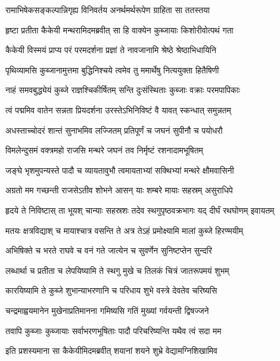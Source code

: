 \twolineshloka
{रामाभिषेकसङ्कल्पान्निगृह्य विनिवर्तय}
{अनर्थमर्थरूपेण ग्राहिता सा ततस्तया} %

\twolineshloka
{हृष्टा प्रतीता कैकेयी मन्थरामिदमब्रवीत्}
{सा हि वाक्येन कुब्जायाः किशोरीवोत्पथं गता} %

\twolineshloka
{कैकेयी विस्मयं प्राप्य परं परमदर्शना}
{प्रज्ञां ते नावजानामि श्रेष्ठे श्रेष्ठाभिधायिनि} %

\twolineshloka
{पृथिव्यामसि कुब्जानामुत्तमा बुद्धिनिश्चये}
{त्वमेव तु ममार्थेषु नित्ययुक्ता हितैषिणी} %

\twolineshloka
{नाहं समवबुद्ध्येयं कुब्जे राज्ञश्चिकीर्षितम्}
{सन्ति दुःसंस्थिताः कुब्जाः वक्राः परमपापिकाः} %

\twolineshloka
{त्वं पद्ममिव वातेन सन्नता प्रियदर्शना}
{उरस्तेऽभिनिविष्टं वै यावत् स्कन्धात् समुन्नतम्} %

\twolineshloka
{अधस्ताच्चोदरं शान्तं सुनाभमिव लज्जितम्}
{प्रतिपूर्णं च जघनं सुपीनौ च पयोधरौ} %

\twolineshloka
{विमलेन्दुसमं वक्त्रमहो राजसि मन्थरे}
{जघनं तव निर्मृष्टं रशनादामभूषितम्} %

\twolineshloka
{जङ्घे भृशमुपन्यस्ते पादौ च व्यायतावुभौ}
{त्वमायताभ्यां सक्थिभ्यां मन्थरे क्षौमवासिनी} %

\twolineshloka
{अग्रतो मम गच्छन्ती राजसेऽतीव शोभने}
{आसन् याः शम्बरे मायाः सहस्रम् असुराधिपे} %

\twolineshloka
{हृदये ते निविष्टास् ता भूयश् चान्याः सहस्रशः}
{तदेव स्थगुपृष्ठवक्रभागः यद् दीर्घं रथघोणम् इवायतम्} %

\twolineshloka
{मतयः क्षत्रविद्याश् च मायाश्चात्र वसन्ति ते}
{अत्र तेऽहं प्रमोक्ष्यामि मालां कुब्जे हिरण्मयीम्} %

\twolineshloka
{अभिषिक्ते च भरते राघवे च वनं गते}
{जात्येन च सुवर्णेन सुनिष्टप्तेन सुन्दरि} %

\twolineshloka
{लब्धार्था च प्रतीता च लेपयिष्यामि ते स्थगु}
{मुखे च तिलकं चित्रं जातरूपमयं शुभम्} %

\twolineshloka
{कारयिष्यामि ते कुब्जे शुभान्याभरणानि च}
{परिधाय शुभे वस्त्रे देवतेव चरिष्यसि} %

\twolineshloka
{चन्द्रमाह्वयमानेन मुखेनाप्रतिमानना}
{गमिष्यसि गतिं मुख्यां गर्वयन्ती द्विषज्जने} %

\twolineshloka
{तवापि कुब्जाः कुब्जायाः सर्वाभरणभूषिताः}
{पादौ परिचरिष्यन्ति यथैव त्वं सदा मम} %

\twolineshloka
{इति प्रशस्यमाना सा कैकेयीमिदमब्रवीत्}
{शयानां शयने शुभ्रे वेद्यामग्निशिखामिव} %

